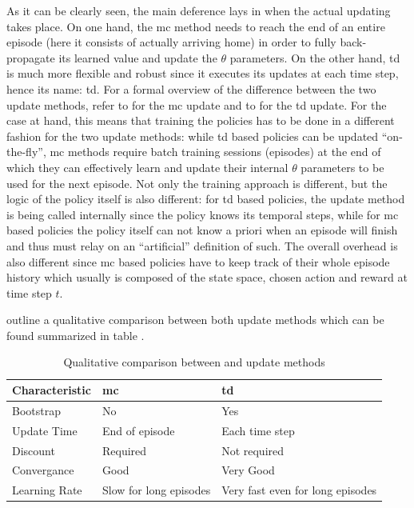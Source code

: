 \documentclass[draft=false]{seal_thesis}
\begin{document}
As it can be clearly seen, the main deference lays in when the actual updating takes place. On one hand, the \gls{mc} method needs to reach the end of an entire episode (\ie here it consists of actually arriving home) in order to fully back-propagate its learned value and update the $\theta$ parameters. On the other hand, \gls{td} is much more flexible and robust since it executes its updates at each time step, hence its name: \gls{td}.
For a formal overview of the difference between the two update methods, refer to  for the \gls{mc} update and to  for the \gls{td} update.
For the case at hand, this means that training the policies has to be done in a different fashion for the two update methods: while \gls{td} based policies can be updated ``on-the-fly'', \gls{mc} methods require batch training sessions (\ie episodes) at the end of which they can effectively learn and update their internal $\theta$ parameters to be used for the next episode. Not only the training approach is different, but the logic of the policy itself is also different: for \gls{td} based policies, the update method is being called internally since the policy knows its temporal steps, while for \gls{mc} based policies the policy itself can not know a priori when an episode will finish and thus must relay on an ``artificial'' definition of such. The overall overhead is also different since \gls{mc} based policies have to keep track of their whole episode history which usually is composed of the state space, chosen action and reward at time step $t$.

\citet{Sutton2017} outline a qualitative comparison between both update methods which can be found summarized in table .

\begin{table}[!ht]
\centering
\begin{tabular}{@{}lll@{}}
\toprule
Characteristic & \gls{mc}                     & \gls{td}                               \\ \midrule
Bootstrap      & No                     & Yes                              \\
Update Time    & End of episode         & Each time step                   \\
Discount       & Required               & Not required                     \\
Convergance    & Good                   & Very Good                        \\
Learning Rate  & Slow for long episodes & Very fast even for long episodes \\ \bottomrule
\end{tabular}
\caption{Qualitative comparison between  and  update methods \citep[p. 130]{Sutton2017}}
\label{tab:mc_td_comp}
\end{table}
\end{document}
